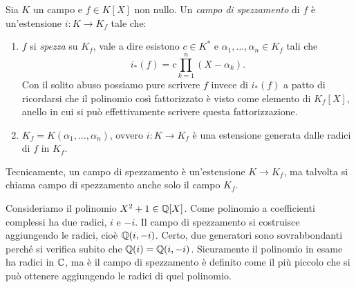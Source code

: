 \begin{defi}
Sia \(K\) un campo e \(f \in K[X]\) non nullo. Un {\em campo di spezzamento} di \(f\) è un'estensione \(i : K \to K_f\) tale che:
\begin{enumerate}
\item \(f\) si {\em spezza} su \(K_f\), vale a dire esistono \(c \in K^\ast\) e \(\alpha_1, \dots{}, \alpha_n \in K_f\) tali che 
\[i_\ast (f) = c\prod_{k=1}^n(X-\alpha_k) .\]
Con il solito abuso possiamo pure scrivere \(f\) invece di \(i_\ast(f)\) a patto di ricordarsi che il polinomio così fattorizzato è visto come elemento di \(K_f[X]\), anello in cui si può effettivamente scrivere questa fattorizzazione.
\item \(K_f = K\left( \alpha_1, \dots{}, \alpha_n \right)\), ovvero \(i : K \to K_f\) è una estensione generata dalle radici di \(f\) in \(K_f\).
\end{enumerate}
Tecnicamente, un campo di spezzamento è un'estensione \(K \to K_f\), ma talvolta si chiama campo di spezzamento anche solo il campo \(K_f\).
\end{defi}



\begin{esem}
Consideriamo il polinomio \(X^2+1 \in \mathbb{Q}[X]\). Come polinomio a coefficienti complessi ha due radici, \(i\) e \(-i\). Il campo di spezzamento si costruisce aggiungendo le radici, cioè \(\mathbb{Q}(i, -i)\). Certo, due generatori sono sovrabbondanti perché si verifica subito che \(\mathbb{Q}(i) = \mathbb{Q}(i, -i)\). Sicuramente il polinomio in esame ha radici in \(\mathbb{C}\), ma è il campo di spezzamento è definito come il più piccolo che si può ottenere aggiungendo le radici di quel polinomio.
\end{esem}

